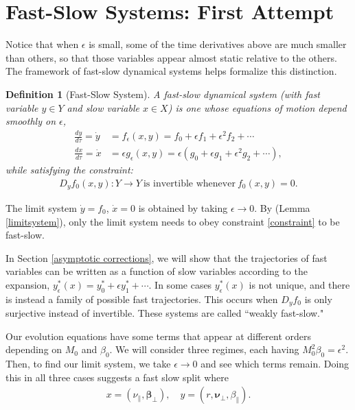 \documentclass{article}
\newtheorem{definition}{Definition}
\newcommand{\ep}{\epsilon}
\newcommand{\pth} [1] {\left( #1 \right) }
\begin{document}
\section{Fast-Slow Systems: First Attempt}
Notice that when $\ep$ is small, some of the time derivatives above are much smaller than others, so that those variables appear almost static relative to the others. The framework of fast-slow dynamical systems helps formalize this distinction. 

\begin{definition}[Fast-Slow System]
    A fast-slow dynamical system (with fast variable $y\in Y$ and slow variable $x\in X$) is one whose equations of motion depend smoothly on $\ep$,
    \begin{align*}
        \frac{dy}{d\tau} = \dot{y} &= f_\ep(x,y) = f_0 + \ep f_1 + \ep^2 f_2 + \cdots \\ 
        \frac{dx}{d\tau} = \dot{x} &= \ep g_\ep(x,y) = \ep \pth{g_0 + \ep g_1 + \ep^2 g_2 + \cdots},
    \end{align*}
    while satisfying the constraint:
    \begin{align} \label{constraint}
        D_yf_0(x,y): Y \rightarrow Y \ \text{is invertible whenever}\ f_0(x,y)=0.
    \end{align}
\end{definition}

The limit system $\dot{y}=f_0$, $\dot{x}=0$ is obtained by taking $\ep\to 0$. By (Lemma \ref{limitsystem}), only the limit system needs to obey constraint \eqref{constraint} to be fast-slow. 

In Section \ref{asymptotic corrections}, we will show that the trajectories of fast variables can be written as a function of slow variables according to the expansion, $y^*_\ep(x) = y^*_0 + \ep y^*_1 + \cdots$. In some cases $y^*_\ep(x)$ is not unique, and there is instead a family of possible fast trajectories. This occurs when $D_yf_0$ is only surjective instead of invertible. These systems are called ``weakly fast-slow." 

Our evolution equations have some terms that appear at different orders depending on $M_0$ and $\beta_0$. We will consider three regimes, each having $M_0^2\beta_0=\ep^2$. Then, to find our limit system, we take $\ep\to0$ and see which terms remain. Doing this in all three cases suggests a fast slow split where 
\begin{align*}
    x = (\nu_\parallel,\bm{\beta}_\perp),\quad y = (r,\bm{\nu}_\perp,\beta_\parallel).
\end{align*}
\end{document}
